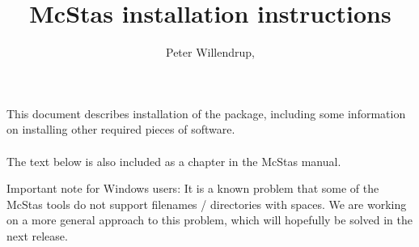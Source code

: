 \documentclass[a4paper,12pt]{article}
\title{McStas installation instructions}
\author{Peter
  Willendrup,\\\htmladdnormallink{peter.willendrup@risoe.dk}{mailto:peter.willendrup@risoe.dk}}
\begin{document}
\maketitle
\abstract \noindent This document describes installation of the
 package, including
some information on installing other required pieces of software.\\\
\\The text below is also included as a chapter in the McStas manual.


Important note for Windows users: It is a known problem that some of
the McStas tools do not support filenames / directories with spaces.
We are working on a more general approach to this problem, which will
hopefully be solved in the next release.
\end{document}
